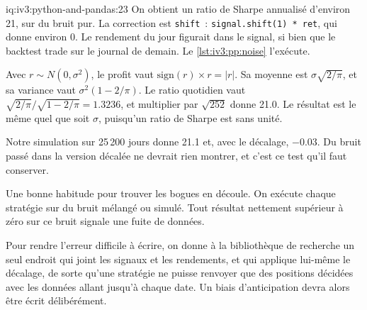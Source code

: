 \begin{solution}{iq:iv3:python-and-pandas:23}
On obtient un ratio de Sharpe annualisé d'environ 21, sur du bruit pur. La correction est \texttt{shift}~: \texttt{signal.shift(1) * ret}, qui donne environ 0. Le rendement du jour figurait dans le signal, si bien que le backtest trade sur le journal de demain. Le \cref{lst:iv3:pp:noise} l'exécute.
\label{lst:iv3:pp:noise}

Avec $r \sim N(0, \sigma^2)$, le profit vaut $\text{sign}(r) \times r = |r|$. Sa moyenne est $\sigma\sqrt{2/\pi}$, et sa variance vaut $\sigma^2(1 - 2/\pi)$. Le ratio quotidien vaut $\sqrt{2/\pi} / \sqrt{1 - 2/\pi} = 1.3236$, et multiplier par $\sqrt{252}$ donne 21.0. Le résultat est le même quel que soit $\sigma$, puisqu'un ratio de Sharpe est sans unité.

Notre simulation sur 25\,200 jours donne 21.1 et, avec le décalage, $-0.03$. Du bruit passé dans la version décalée ne devrait rien montrer, et c'est ce test qu'il faut conserver.

Une bonne habitude pour trouver les bogues en découle. On exécute chaque stratégie sur du bruit mélangé ou simulé. Tout résultat nettement supérieur à zéro sur ce bruit signale une fuite de données.

Pour rendre l'erreur difficile à écrire, on donne à la bibliothèque de recherche un seul endroit qui joint les signaux et les rendements, et qui applique lui-même le décalage, de sorte qu'une stratégie ne puisse renvoyer que des positions décidées avec les données allant jusqu'à chaque date. Un biais d'anticipation devra alors être écrit délibérément.

\end{solution}

